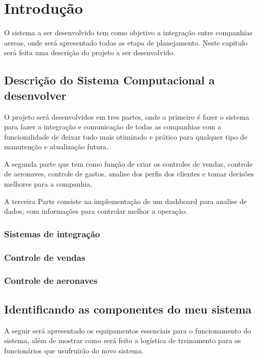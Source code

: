 

\chapter{ Introdu\c{c}\~{a}o}

O sistema a ser desenvolvido tem como objetivo a integração entre
companhias aereas, onde será
apresentado todas as etapa de planejamento. 
Neste capitulo será feita uma descrição do projeto
a ser desenvolvido.

\section{Descri\c{c}\~{a}o do Sistema Computacional a desenvolver}
O projeto será desenvolvidos em tres partes, onde o primeiro é fazer o sistema para fazer a integração 
e comunicação de todas as companhias com a funcionalidade de deixar tudo mais otimizado e prático para
qualquer tipo de manutenção e atualização futura.

A segunda parte que tem como função de criar os controles de vendas, controle de aeronaves, 
controle de gastos, analise dos perfis dos clientes e tomar decisões melhores para a companhia.

A terceira Parte consiste na implementação de um dashboard para analise de dados, com informações 
para controlar melhor a operação.
\subsection{Sistemas de integração}

\subsection{Controle de vendas}

\subsection{Controle de aeronaves}


\section{Identificando as componentes do meu sistema}
A seguir será apresentado os equipamentos essenciais para o funcionamento do sistema, além de
mostrar como será feito a logística de treinamento para os funcionários que usufruirão do novo
sistema.

